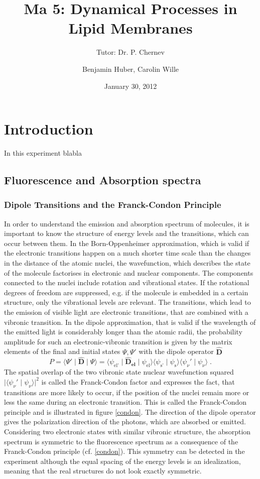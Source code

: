 \documentclass[draft]{scrartcl}
\title{Ma 5: Dynamical Processes in Lipid Membranes}
\subtitle{Tutor: Dr. P. Chernev}
\author{Benjamin Huber, Carolin Wille}
\date{January 30, 2012}
\numberwithin{equation}{section}
\numberwithin{figure}{section}
\numberwithin{table}{section}
\newcommand{\eq}[2]{\begin{equation}#1\label{#2}\end{equation}}
\newcommand{\ve}[1]{\mathbf{ #1} }
\begin{document}
\thispagestyle{empty}
\maketitle
\tableofcontents
\clearpage

\section{Introduction}
In this experiment blabla


\subsection{Fluorescence and Absorption spectra}
\subsubsection{Dipole Transitions and the Franck-Condon Principle}
In order to understand the emission and absorption spectrum of molecules, it is important to know the structure of energy levels and the transitions, which can occur between them. In the Born-Oppenheimer approximation, which is valid if the electronic transitions happen on a much shorter time scale than the changes in the distance of the atomic nuclei, the wavefunction, which describes the state of the molecule factorises in electronic and nuclear components. The components connected to the nuclei include rotation and vibrational states. If the rotational degrees of freedom are suppressed, e.g. if the molecule is embedded in a certain structure, only the vibrational levels are relevant. The transitions, which lead to the emission of visible light are electronic transitions, that are combined with a vibronic transition. In the dipole approximation, that is valid if the wavelength of the emitted light is considerably longer than the atomic radii, the probability amplitude for such an electronic-vibronic transition is given by the matrix elements of the final and initial states $\Psi,\Psi'$ with the dipole operator $\ve {\hat{D}}$
\eq{ P = \langle \Psi'  \mid   \ve {\hat{D}} \mid \Psi \rangle =  \langle \psi_\text{el'} \mid   \ve {\hat{D}_{el}} \mid \psi_\text{el} \rangle \langle \psi_\text{s'} \mid \psi_\text{s} \rangle \langle \psi_\nu'  \mid  \psi_\nu \rangle \; .} {transition }
The spatial overlap of the two vibronic state nuclear wavefunction squared  $\lvert \langle \psi_\nu'  \mid  \psi_\nu \rangle \rvert ^2$ is called the Franck-Condon factor and expresses the fact, that transitions are more likely to occur, if the position of the nuclei remain more or less the same during an electronic transition. This is called the Franck-Condon principle and is illustrated in figure \ref{condon}. 
The direction of the dipole operator gives the polarization direction of the photons, which are absorbed or emitted.
Considering two electronic states with similar vibronic structure, the absorption spectrum is symmetric to the fluorescence spectrum as a consequence of the Franck-Condon principle (cf. \ref{condon}). This symmetry can be detected in the experiment although the equal spacing of the energy levels is an idealization, meaning that the real structures do not look exactly symmetric.
\end{document}
